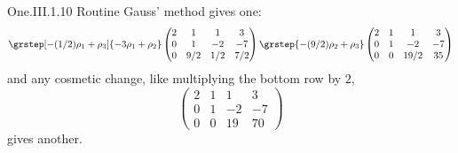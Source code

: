 \begin{ans}{One.III.1.10}
      Routine Gauss' method gives one:
      \begin{equation*}
        \grstep[-(1/2)\rho_1+\rho_3]{-3\rho_1+\rho_2}
        \begin{pmatrix}
          2  &1  &1  &3  \\
          0  &1  &-2 &-7 \\
          0  &9/2&1/2&7/2
        \end{pmatrix}
        \grstep{-(9/2)\rho_2+\rho_3}
        \begin{pmatrix}
          2  &1  &1    &3  \\
          0  &1  &-2   &-7 \\
          0  &0  &19/2 &35
        \end{pmatrix}
      \end{equation*}
      and any cosmetic change, like multiplying the bottom row by \( 2 \),
      \begin{equation*}
        \begin{pmatrix}
          2  &1  &1    &3  \\
          0  &1  &-2   &-7 \\
          0  &0  &19   &70
        \end{pmatrix}
      \end{equation*}
      gives another.
    
\end{ans}
